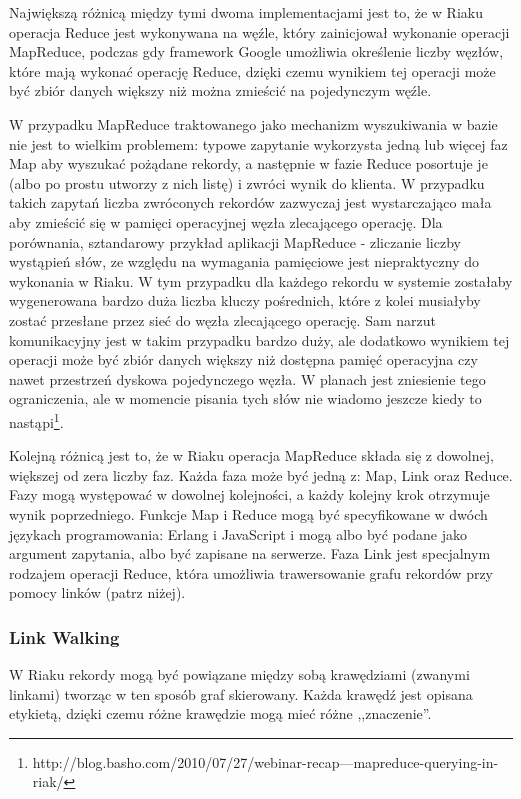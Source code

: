 Największą różnicą między tymi dwoma implementacjami jest to, że w Riaku operacja Reduce jest wykonywana na węźle, który zainicjował wykonanie operacji MapReduce, podczas gdy framework Google umożliwia określenie liczby węzłów, które mają wykonać operację Reduce, dzięki czemu wynikiem tej operacji może być zbiór danych większy niż można zmieścić na pojedynczym węźle.

W przypadku MapReduce traktowanego jako mechanizm wyszukiwania w bazie nie jest to wielkim problemem: typowe zapytanie wykorzysta jedną lub więcej faz Map aby wyszukać pożądane rekordy, a następnie w fazie Reduce posortuje je (albo po prostu utworzy z nich listę) i zwróci wynik do klienta.
W przypadku takich zapytań liczba zwróconych rekordów zazwyczaj jest wystarczająco mała aby zmieścić się w pamięci operacyjnej węzła zlecającego operację.
Dla porównania, sztandarowy przykład aplikacji MapReduce - zliczanie liczby wystąpień słów, ze względu na wymagania pamięciowe jest niepraktyczny do wykonania w Riaku.
W tym przypadku dla każdego rekordu w systemie zostałaby wygenerowana bardzo duża liczba kluczy pośrednich, które z kolei musiałyby zostać przesłane przez sieć do węzła zlecającego operację.
Sam narzut komunikacyjny jest w takim przypadku bardzo duży, ale dodatkowo wynikiem tej operacji może być zbiór danych większy niż dostępna pamięć operacyjna czy nawet przestrzeń dyskowa pojedynczego węzła.
W planach jest zniesienie tego ograniczenia, ale w momencie pisania tych słów nie wiadomo jeszcze kiedy to nastąpi\footnote{http://blog.basho.com/2010/07/27/webinar-recap---mapreduce-querying-in-riak/}.

Kolejną różnicą jest to, że w Riaku operacja MapReduce składa się z dowolnej, większej od zera liczby faz.
Każda faza może być jedną z: Map, Link oraz Reduce.
Fazy mogą występować w dowolnej kolejności, a każdy kolejny krok otrzymuje wynik poprzedniego.
Funkcje Map i Reduce mogą być specyfikowane w dwóch językach programowania: Erlang i JavaScript i mogą albo być podane jako argument zapytania, albo być zapisane na serwerze.
Faza Link jest specjalnym rodzajem operacji Reduce, która umożliwia trawersowanie grafu rekordów przy pomocy linków (patrz niżej).

\subsubsection*{Link Walking}

W Riaku rekordy mogą być powiązane między sobą krawędziami (zwanymi linkami) tworząc w ten sposób graf skierowany.
Każda krawędź jest opisana etykietą, dzięki czemu różne krawędzie mogą mieć różne ,,znaczenie''.

